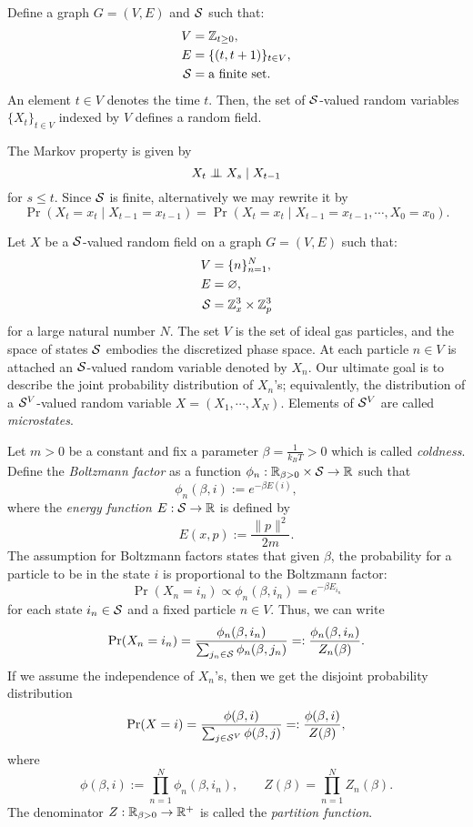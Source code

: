 \documentclass{../exp}
\begin{document}
\begin{ex}
Define a graph $G=(V,E)$ and $\mathcal{S}$ such that:
\begin{align*}
V&=\mathbb{Z}_{t\ge0},\\
E&=\{(t,t+1)\}_{t\in V},\\
\mathcal{S}&=\text{a finite set}.
\end{align*}
An element $t\in V$ denotes the time $t$.
Then, the set of $\mathcal{S}$-valued random variables $\{X_t\}_{t\in V}$ indexed by $V$ defines a random field.

The Markov property is given by
\[X_t\mathrel{\perp\mspace{-10mu}\perp} X_s\mid X_{t-1}\]
for $s\le t$.
Since $\mathcal{S}$ is finite, alternatively we may rewrite it by
\[\Pr(X_t=x_t\mid X_{t-1}=x_{t-1})=\Pr(X_t=x_t\mid X_{t-1}=x_{t-1},\cdots,X_0=x_0).\]
\end{ex}

\begin{ex}
Let $X$ be a $\mathcal{S}$-valued random field on a graph $G=(V,E)$ such that:
\begin{align*}
V&=\{n\}_{n=1}^N,\\
E&=\varnothing,\\
\mathcal{S}&=\mathbb{Z}_x^3\times\mathbb{Z}_p^3
\end{align*}
for a large natural number $N$.
The set $V$ is the set of ideal gas particles, and the space of states $\mathcal{S}$ embodies the discretized phase space.
At each particle $n\in V$ is attached an $\mathcal{S}$-valued random variable denoted by $X_n$.
Our ultimate goal is to describe the joint probability distribution of $X_n$'s; equivalently, the distribution of a $\mathcal{S}^V$-valued random variable $X=(X_1,\cdots,X_N)$.
Elements of $\mathcal{S}^V$ are called \emph{microstates}.

Let $m>0$ be a constant and fix a parameter $\beta=\frac1{k_BT}>0$ which is called \emph{coldness}.
Define the \emph{Boltzmann factor} as a function $\phi_n:\R_{\beta>0}\x\cS\to\R$ such that
\[\phi_n(\beta,i):=e^{-\beta E(i)},\]
where the \emph{energy function} $E:\cS\to\R$ is defined by
\[E(x,p):=\frac{\|p\|^2}{2m}.\]
The assumption for Boltzmann factors states that given $\beta$, the probability for a particle to be in the state $i$ is proportional to the Boltzmann factor: 
\[\Pr(X_n=i_n)\propto\phi_n(\beta,i_n)=e^{-\beta E_{i_n}}\]
for each state $i_n\in\mathcal{S}$ and a fixed particle $n\in V$.
Thus, we can write
\[\Pr(X_n=i_n)=\frac{\phi_n(\beta,i_n)}{\sum_{j_n\in\mathcal{S}}\phi_n(\beta,j_n)}=:\frac{\phi_n(\beta,i_n)}{Z_n(\beta)}.\]
If we assume the independence of $X_n$'s, then we get the disjoint probability distribution
\[\Pr(X=i)=\frac{\phi(\beta,i)}{\sum_{j\in\mathcal{S}^V}\phi(\beta,j)}=:\frac{\phi(\beta,i)}{Z(\beta)},\]
where
\[\phi(\beta,i):=\prod_{n=1}^N\phi_n(\beta,i_n),\qquad Z(\beta)=\prod_{n=1}^NZ_n(\beta).\]
The denominator $Z:\R_{\beta>0}\to\R^+$ is called the \emph{partition function}.
\end{ex}
\end{document}
